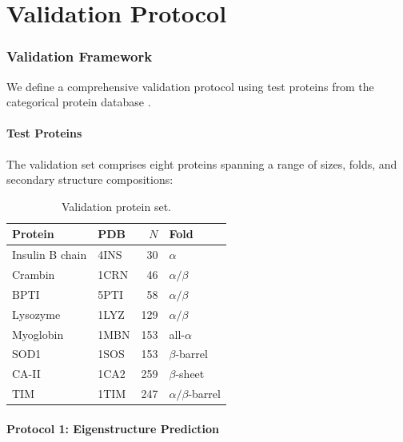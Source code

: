 \documentclass[11pt,twocolumn,a4paper]{article}
\theoremstyle{definition}
\theoremstyle{remark}
\begin{document}
\part{Validation Protocol}

\section{Validation Framework}
\label{sec:validation}

We define a comprehensive validation protocol using test proteins from the categorical protein database \citep{sachikonye2025c}.

\subsection{Test Proteins}

The validation set comprises eight proteins spanning a range of sizes, folds, and secondary structure compositions:

\begin{table}[h]
\centering
\small
\begin{tabular}{@{}llrl@{}}
\toprule
\textbf{Protein} & \textbf{PDB} & \textbf{$N$} & \textbf{Fold} \\
\midrule
Insulin B chain & 4INS & 30 & $\alpha$ \\
Crambin & 1CRN & 46 & $\alpha/\beta$ \\
BPTI & 5PTI & 58 & $\alpha/\beta$ \\
Lysozyme & 1LYZ & 129 & $\alpha/\beta$ \\
Myoglobin & 1MBN & 153 & all-$\alpha$ \\
SOD1 & 1SOS & 153 & $\beta$-barrel \\
CA-II & 1CA2 & 259 & $\beta$-sheet \\
TIM & 1TIM & 247 & $\alpha/\beta$-barrel \\
\bottomrule
\end{tabular}
\caption{Validation protein set.}
\label{tab:test_proteins}
\end{table}

\subsection{Protocol 1: Eigenstructure Prediction}
\end{document}
